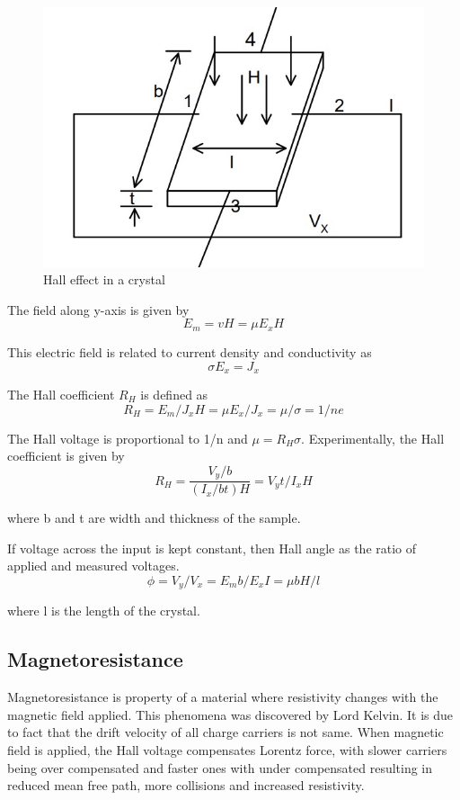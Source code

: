 \documentclass[a4paper, amsfonts, amssymb, amsmath, reprint, showkeys, nofootinbib, twoside]{revtex4-1}
\begin{document}
\begin{figure}[H]
	\centering
	\includegraphics[scale=0.36]{1} 
	\caption{Hall effect in a crystal}
	\label{1}
\end{figure}

The field along y-axis is given by 
\begin{equation}
	E_m=vH=\mu E_x H
\end{equation}

This electric field is related to current density and conductivity as
\begin{equation}
	\sigma E_x=J_x
\end{equation}

The Hall coefficient $R_H$ is defined as 
\begin{equation}
	R_H=E_m/J_x H=\mu E_x /J_x=\mu/\sigma=1/ne
\end{equation}

The Hall voltage is proportional to 1/n and $ \mu =R_H \sigma $. Experimentally, the Hall coefficient is given by 
\begin{equation}
	R_H=\frac{V_y /b}{(I_x/bt)H}=V_y t/I_x H
\end{equation}

where b and t are width and thickness of the sample.

If voltage across the input is kept constant, then Hall angle as the ratio of applied and measured voltages.
\begin{equation}
	\phi=V_y/V_x=E_m b/E_x I=\mu b H/l 
\end{equation}

where l is the length of the crystal. 

\subsection{Magnetoresistance}
Magnetoresistance is property of a material where resistivity changes with the magnetic field applied. This phenomena was discovered by Lord Kelvin. It is due to fact that the drift velocity of all charge carriers is not same. When magnetic field is applied, the Hall voltage compensates Lorentz force, with slower carriers being over compensated and faster ones with under compensated resulting in reduced mean free path, more collisions and increased resistivity. 
\end{document}
